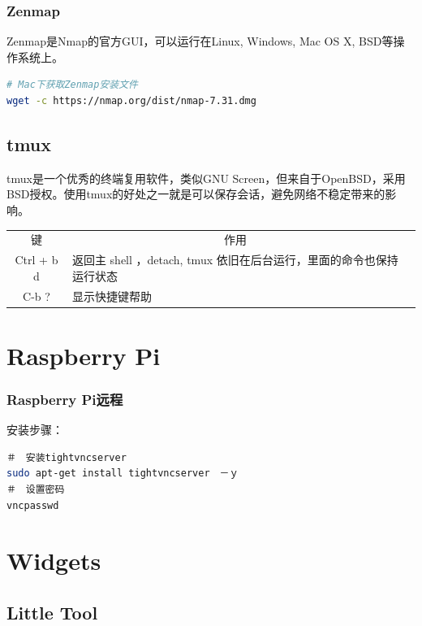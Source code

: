\documentclass[letter]{book}
\begin{document}
\subsection{Zenmap}

Zenmap是Nmap的官方GUI，可以运行在Linux, Windows, Mac OS X, BSD等操作系统上。

\begin{lstlisting}[language=Bash]
# Mac下获取Zenmap安装文件
wget -c https://nmap.org/dist/nmap-7.31.dmg
\end{lstlisting}


\section{tmux}

tmux是一个优秀的终端复用软件，类似GNU Screen，但来自于OpenBSD，采用BSD授权。使用tmux的好处之一就是可以保存会话，避免网络不稳定带来的影响。

\begin{tabular}{|c|p{8cm}|c|}
	\hline
	\multirow{1}{*}{键}
	& \multicolumn{1}{c|}{作用}  \\			
	\cline{1-2}
	Ctrl + b d  & 返回主 shell ，detach, tmux 依旧在后台运行，里面的命令也保持运行状态\\
	\hline
	C-b ? & 显示快捷键帮助\\
	\hline
\end{tabular}


\chapter{Raspberry Pi}

\subsection{Raspberry Pi远程}

安装步骤：

\begin{lstlisting}[language=Bash]
＃　安装tightvncserver
sudo apt-get install tightvncserver　－ｙ
＃　设置密码
vncpasswd
\end{lstlisting}

\chapter{Widgets}

\section{Little Tool}
\end{document}
